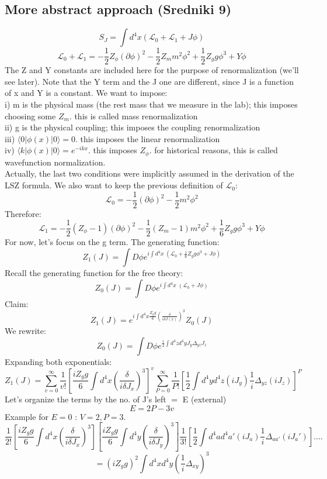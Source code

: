 \documentclass[12 pt]{article}
\begin{document}
\subsection*{More abstract approach (Sredniki 9)}
\[  S_J =  \int d^4 x (\mathcal{L}_0 + \mathcal{L}_1 + J\phi) \]
\[  \mathcal{L}_0 + \mathcal{L}_1 = - \frac{1}{2} Z_{\phi} (\partial \phi)^2 - \frac{1}{2} Z_m m^2 \phi^2 + \frac{1}{2} Z_g g \phi^3 + Y \phi \]
The Z and Y constants are included here for the purpose of renormalization (we'll see later). Note that the Y term and the J one are different, since J is a function of x and Y is a constant. We want to impose:
\\
i) m is the physical mass (the rest mass that we measure in the lab); this imposes choosing some $Z_m$. this is called mass renormalization
\\
ii) g is the physical coupling; this imposes the coupling renormalization
\\
iii) $\langle 0| \phi(x) |0\rangle = 0$. this imposes the linear renormalization
\\
iv) $\langle k| \phi(x) |0\rangle = e^{-ikx}$. this imposes $Z_{\phi}$. for historical reasons, this is called wavefunction normalization.
\\ 
Actually, the last two conditions were implicitly assumed in the derivation of the LSZ formula. We also want to keep the previous definition of $\mathcal{L}_0$:
\[   \mathcal{L}_0 = -\frac{1}{2} (\partial \phi)^2 - \frac{1}{2} m^2 \phi^2   \]
Therefore:
\[ \mathcal{L}_1 = - \frac{1}{2} (Z_{\phi} - 1) (\partial \phi)^2 - \frac{1}{2} (Z_{m} - 1) m^2 \phi^2 + \frac{1}{6} Z_g g \phi^3 + Y \phi \]
For now, let's focus on the g term. The generating function:
\[  Z_1 (J) = \int D\phi e^{i\int d^4 x \; (\mathcal{L}_0 + \frac{1}{6} Z_g g \phi^3 + J\phi)}  \]
Recall the generating function for the free theory:
\[  Z_0 (J) = \int D\phi e^{i\int d^4 x\; (\mathcal{L}_0 + J\phi)}   \]
Claim:
\[  Z_1 (J) =   e^{i \int d^4 x \frac{Z_g g}{6} ( \frac{\delta}{i \delta J(x)})^3  }  Z_0 (J)  \]
We rewrite:
\[ Z_0 (J) = \int D\phi e^{\frac{i}{2} \int d^4 z d^4 y J_y \Delta_{yz} J_z}  \]
Expanding both exponentials:
\[  Z_1 (J) = \sum_{v=0}^{\infty} \frac{1}{v!} \left[ \frac{iZ_g g}{6} \int d^4 x (\frac{\delta}{i \delta J_x})^3  \right]^v  \sum_{P=0}^{\infty} \frac{1}{P!} \left[  \frac{1}{2} \int d^4 y d^4 z (iJ_y) \frac{1}{i} \Delta_{yz} (iJ_z)  \right]^P \]
Let's organize the terms by the no. of J's left $=$ E (external)
\[  E = 2P - 3v  \]
Example for $E=0$ : $V=2, P=3$.
\[  \frac{1}{2!} \left[ \frac{iZ_g g}{6} \int d^4 x (\frac{\delta}{i\delta J_x})^3 \right] \left[ \frac{iZ_g g}{6} \int d^4 y (\frac{\delta}{i\delta J_y})^3 \right]  \frac{1}{3!} \left[ \frac{1}{2} \int d^4a d^4a' (iJ_a) \frac{1}{i} \Delta_{aa'} (iJ_a')  \right] .... \]
\[ = (iZ_g g)^2 \int d^4 x d^4 y (\frac{1}{i} \Delta_{xy})^3  \]
\end{document}
